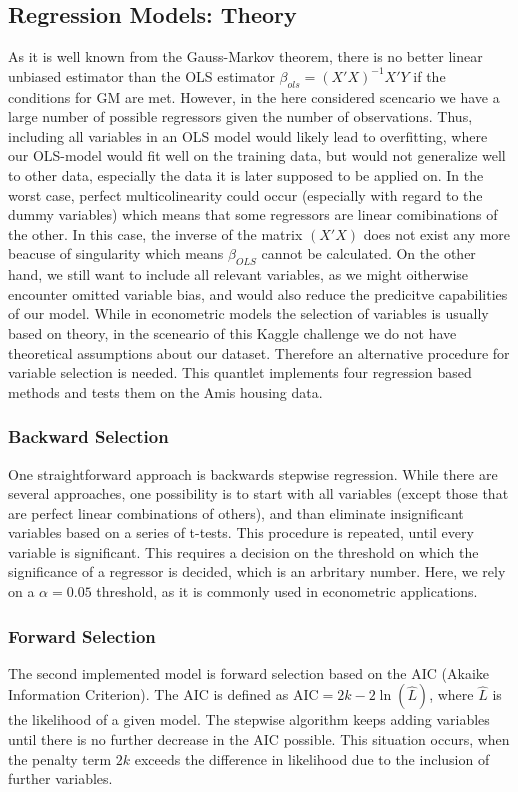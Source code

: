 \subsection{Regression Models: Theory}
As it is well known from the Gauss-Markov theorem, there is no better linear unbiased estimator than the OLS estimator $\beta_{ols} = (X'X)^{-1}X'Y$  if the conditions for GM are met. However, in the here considered scencario we have a large number of possible regressors given the number of observations. Thus, including all variables in an OLS model would likely lead to overfitting, where our OLS-model would fit well on the training data, but would not generalize well to other data, especially the data it is later supposed to be applied on. In the worst case, perfect multicolinearity could occur (especially with regard to the dummy variables)  which means that some regressors are linear comibinations of the other. In this case, the inverse of the matrix $(X'X)$ does not exist any more beacuse of singularity which means $\beta_{OLS}$ cannot be calculated.  
On the other hand, we still want to include all relevant variables, as we might oitherwise encounter omitted variable bias, and would also reduce the predicitve capabilities of our model. 
While in econometric models  the selection of variables is usually based on theory, in the sceneario of this Kaggle challenge we do not have theoretical assumptions about our dataset. Therefore an alternative procedure for variable selection is needed. This quantlet implements four regression based methods and tests them on the Amis housing data. 

\subsubsection{Backward Selection}
One straightforward approach is backwards stepwise regression. While there are several approaches, one possibility is to  start with all variables (except those that are perfect linear combinations of others), and than eliminate insignificant variables based on a series of  t-tests. This procedure is repeated, until every variable is significant. This requires a decision on the threshold on which the significance of a regressor is decided, which is an arbritary number. Here, we rely on a $\alpha = 0.05$ threshold, as it is commonly used in econometric applications. 

\subsubsection{Forward Selection}
The second implemented model is forward selection based on the AIC (Akaike Information Criterion). The AIC is defined as 
${\displaystyle \mathrm{AIC}=2k-2\ln({\hat{L}})}$, where $\hat{L}$ is the likelihood of a given model. The stepwise algorithm keeps adding variables until there is no further decrease in the AIC possible. This situation occurs, when the penalty term $2k$ exceeds the difference in likelihood due to the inclusion of further variables. 

